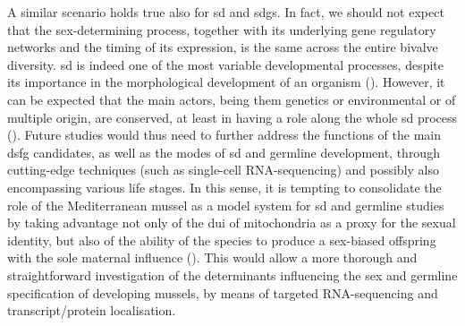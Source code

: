 A similar scenario holds true also for \gls{sd} and \glspl{sdg}. In fact, we should not expect that the sex-determining process, together with its underlying gene regulatory networks and the timing of its expression, is the same across the entire bivalve diversity. \gls{sd} is indeed one of the most variable developmental processes, despite its importance in the morphological development of an organism (). However, it can be expected that the main actors, being them genetics or environmental or of multiple origin, are conserved, at least in having a role along the whole \gls{sd} process (). Future studies would thus need to further address the functions of the main \gls{dsfg} candidates, as well as the modes of \gls{sd} and germline development, through cutting-edge techniques (such as single-cell RNA-sequencing) and possibly also encompassing various life stages. In this sense, it is tempting to consolidate the role of the Mediterranean mussel as a model system for \gls{sd} and germline studies by taking advantage not only of the \gls{dui} of mitochondria as a proxy for the sexual identity, but also of the ability of the species to produce a sex-biased offspring with the sole maternal influence (). This would allow a more thorough and straightforward investigation of the determinants influencing the sex and germline specification of developing mussels, by means of targeted RNA-sequencing and transcript/protein localisation.

% 
